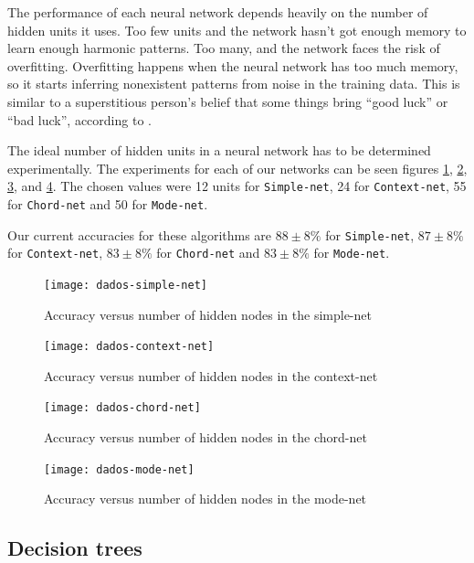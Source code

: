 \documentclass{article}
\begin{document}
The performance of each neural network depends heavily on the number
of hidden units it uses. Too few units and the network hasn't got
enough memory to learn enough harmonic patterns. Too many, and the
network faces the risk of overfitting. Overfitting happens when the
neural network has too much memory, so it starts inferring nonexistent
patterns from noise in the training data. This is similar to a
superstitious person's belief that some things bring ``good luck'' or
``bad luck'', according to \cite{white.ea:superstitious}.

The ideal number of hidden units in a neural network has to be
determined experimentally. The experiments for each of our networks
can be seen figures \ref{fig:simple-net}, \ref{fig:context-net},
\ref{fig:chord-net}, and \ref{fig:mode-net}. The chosen values were 12
units for \texttt{Simple-net}, 24 for \texttt{Context-net}, 55 for
\texttt{Chord-net} and 50 for \texttt{Mode-net}.

Our current accuracies for these algorithms are $88\pm 8\%$ for
\texttt{Simple-net}, $87 \pm 8\%$ for \texttt{Context-net}, $83 \pm
8\%$ for \texttt{Chord-net} and $83 \pm 8\%$ for \texttt{Mode-net}.

\begin{figure}
  \texttt{[image: dados-simple-net]}
  \caption{Accuracy versus number of hidden nodes in the simple-net}
  \label{fig:simple-net}
\end{figure}

\begin{figure}
  \texttt{[image: dados-context-net]}
  \caption{Accuracy versus number of hidden nodes in the context-net}
  \label{fig:context-net}
\end{figure}

\begin{figure}
  \texttt{[image: dados-chord-net]}
  \caption{Accuracy versus number of hidden nodes in the chord-net}
  \label{fig:chord-net}
\end{figure}

\begin{figure}
  \texttt{[image: dados-mode-net]}
  \caption{Accuracy versus number of hidden nodes in the mode-net}
  \label{fig:mode-net}
\end{figure}

\subsection{Decision trees}
\label{sec:decision-trees}
\end{document}
